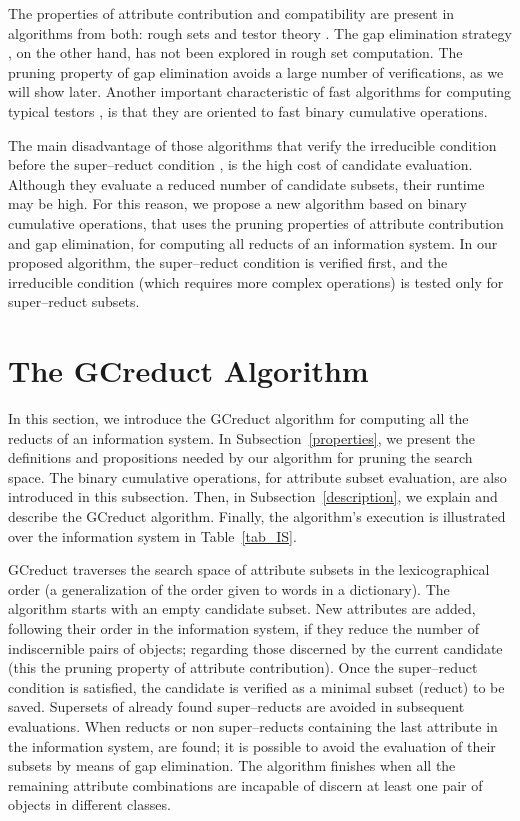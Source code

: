 \documentclass[authoryear,preprint,review,12pt]{elsarticle}
\begin{document}
  The properties of attribute contribution and compatibility are present in algorithms from both: rough sets and testor theory \citep{WangP07,Sanchez10,Lias13}. The gap elimination strategy \citep{Santiesteban03,Lias13}, on the other hand, has not been explored in rough set computation. The pruning property of gap elimination avoids a large number of verifications, as we will show later. Another important characteristic of fast algorithms for computing typical testors \citep{Sanchez10,Lias13}, is that they are oriented to fast binary cumulative operations. 
  
  The main disadvantage of those algorithms that verify the irreducible condition before the super--reduct condition \citep{Santiesteban03,WangP07,Lias13}, is the high cost of candidate evaluation. Although they evaluate a reduced number of candidate subsets, their runtime may be high. For this reason, we propose a new algorithm based on binary cumulative operations, that uses the pruning properties of attribute contribution and gap elimination, for computing all reducts of an information system. In our proposed algorithm, the super--reduct condition is verified first, and the irreducible condition (which requires more complex operations) is tested only for super--reduct subsets.
  
  
\section{The GCreduct Algorithm}\label{GCreduct}
  In this section, we introduce the GCreduct algorithm for computing all the reducts of an information system. In  Subsection~\ref{properties}, we present the definitions and propositions needed by our algorithm for pruning the search space.  The binary cumulative operations, for attribute subset evaluation, are also introduced in this subsection. Then, in Subsection~\ref{description}, we explain and describe the GCreduct algorithm. Finally, the algorithm's execution is illustrated over the information system in Table~\ref{tab_IS}.
  
  GCreduct traverses the search space of attribute subsets in the lexicographical order (a generalization of the order given to words in a dictionary). The algorithm starts with an empty candidate subset. New attributes are added, following their order in the information system, if they reduce the number of indiscernible pairs of objects; regarding those discerned by the current candidate (this the pruning property of attribute contribution). Once the super--reduct condition is satisfied, the candidate is verified as a minimal subset (reduct) to be saved. Supersets of already found super--reducts are avoided in subsequent evaluations. When reducts or non super--reducts containing the last attribute in the information system, are found; it is possible to avoid the evaluation of their subsets by means of gap elimination. The algorithm finishes when all the remaining attribute combinations are incapable of discern at least one pair of objects in different classes.
\end{document}
